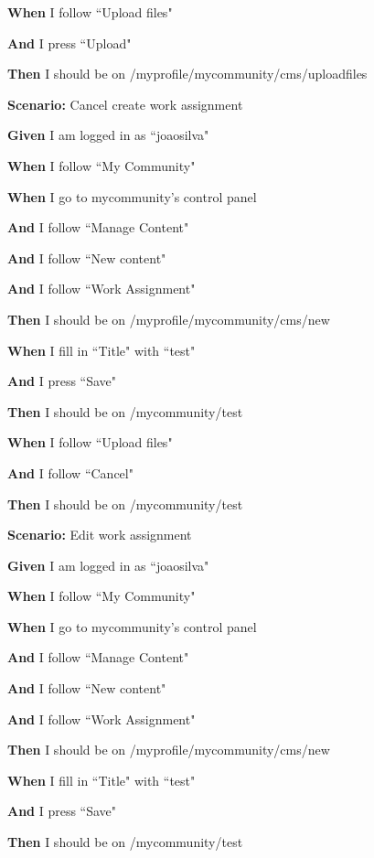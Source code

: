     \textbf{When} I follow ``Upload files"
   
    \textbf{And} I press ``Upload"
   
    \textbf{Then} I should be on /myprofile/mycommunity/cms/uploadfiles

\item \textbf{Scenario:} Cancel create work assignment
    
    \textbf{Given} I am logged in as ``joaosilva"
    
    \textbf{When} I follow ``My Community"
    
    \textbf{When} I go to mycommunity's control panel
    
    \textbf{And}  I follow ``Manage Content"
    
    \textbf{And}  I follow ``New content"
    
    \textbf{And}  I follow ``Work Assignment"
    
    \textbf{Then} I should be on /myprofile/mycommunity/cms/new
    
    \textbf{When} I fill in ``Title" with ``test"
    
    \textbf{And}  I press ``Save"
    
    \textbf{Then} I should be on /mycommunity/test
    
    \textbf{When} I follow ``Upload files"
    
    \textbf{And}  I follow ``Cancel"
    
    \textbf{Then} I should be on /mycommunity/test

\item \textbf{Scenario:} Edit work assignment 
    
    \textbf{Given} I am logged in as ``joaosilva"
    
    \textbf{When} I follow ``My Community"
    
    \textbf{When} I go to mycommunity's control panel
    
    \textbf{And} I follow ``Manage Content"
    
    \textbf{And} I follow ``New content"
    
    \textbf{And} I follow ``Work Assignment"
    
    \textbf{Then} I should be on /myprofile/mycommunity/cms/new
    
    \textbf{When} I fill in ``Title" with ``test"
    
    \textbf{And} I press ``Save"
    
    \textbf{Then} I should be on /mycommunity/test
    
